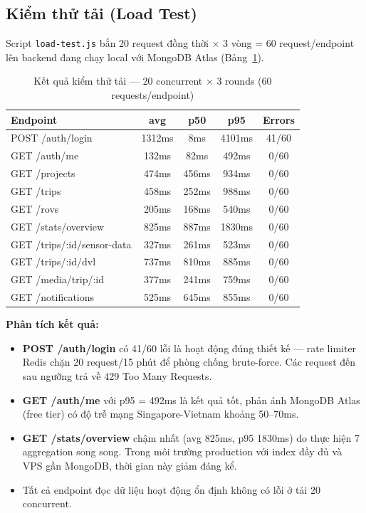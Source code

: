 \documentclass[../DoAn.tex]{subfiles}
\begin{document}
\subsection{Kiểm thử tải (Load Test)}

Script \texttt{load-test.js} bắn 20 request đồng thời × 3 vòng = 60 request/endpoint lên backend đang chạy local với MongoDB Atlas (Bảng~\ref{tab:loadtest}).

\begin{table}[H]
\centering
\caption{Kết quả kiểm thử tải — 20 concurrent × 3 rounds (60 requests/endpoint)}
\label{tab:loadtest}
\small
\begin{tabular}{|p{5.0cm}|c|c|c|c|}
\hline
\textbf{Endpoint} & \textbf{avg} & \textbf{p50} & \textbf{p95} & \textbf{Errors} \\
\hline
POST /auth/login & 1312ms & 8ms & 4101ms & 41/60 \\
\hline
GET /auth/me & 132ms & 82ms & 492ms & 0/60 \\
\hline
GET /projects & 474ms & 456ms & 934ms & 0/60 \\
\hline
GET /trips & 458ms & 252ms & 988ms & 0/60 \\
\hline
GET /rovs & 205ms & 168ms & 540ms & 0/60 \\
\hline
GET /stats/overview & 825ms & 887ms & 1830ms & 0/60 \\
\hline
GET /trips/:id/sensor-data & 327ms & 261ms & 523ms & 0/60 \\
\hline
GET /trips/:id/dvl & 737ms & 810ms & 885ms & 0/60 \\
\hline
GET /media/trip/:id & 377ms & 241ms & 759ms & 0/60 \\
\hline
GET /notifications & 525ms & 645ms & 855ms & 0/60 \\
\hline
\end{tabular}
\end{table}

\textbf{Phân tích kết quả:}

\begin{itemize}[leftmargin=*, topsep=4pt, itemsep=2pt]
  \item \textbf{POST /auth/login} có 41/60 lỗi là hoạt động đúng thiết kế — rate limiter Redis chặn 20 request/15 phút để phòng chống brute-force. Các request đến sau ngưỡng trả về 429 Too Many Requests.
  \item \textbf{GET /auth/me} với p95 = 492ms là kết quả tốt, phản ánh MongoDB Atlas (free tier) có độ trễ mạng Singapore-Vietnam khoảng 50--70ms.
  \item \textbf{GET /stats/overview} chậm nhất (avg 825ms, p95 1830ms) do thực hiện 7 aggregation song song. Trong môi trường production với index đầy đủ và VPS gần MongoDB, thời gian này giảm đáng kể.
  \item Tất cả endpoint đọc dữ liệu hoạt động ổn định không có lỗi ở tải 20 concurrent.
\end{itemize}
\end{document}
